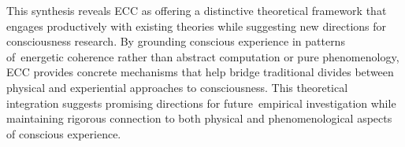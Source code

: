 \begin{refsection}
  This synthesis reveals ECC as offering a distinctive theoretical framework that engages productively with existing theories while suggesting new directions for consciousness research. By grounding conscious experience in patterns of~energetic coherence rather than abstract computation or pure phenomenology, ECC provides concrete mechanisms that help bridge traditional divides between physical and experiential approaches to consciousness. This theoretical integration suggests promising directions for future~empirical investigation while maintaining rigorous connection to both physical and phenomenological aspects of conscious experience. 

  


\end{refsection}
